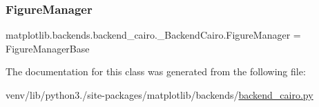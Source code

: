 \subsubsection{\texorpdfstring{Figure\+Manager}{FigureManager}}
{\footnotesize\ttfamily matplotlib.\+backends.\+backend\+\_\+cairo.\+\_\+\+Backend\+Cairo.\+Figure\+Manager = Figure\+Manager\+Base\hspace{0.3cm}{\ttfamily [static]}}



The documentation for this class was generated from the following file\+:\begin{DoxyCompactItemize}
\item 
venv/lib/python3./site-\/packages/matplotlib/backends/\hyperlink{backend__cairo_8py}{backend\+\_\+cairo.\+py}\end{DoxyCompactItemize}
